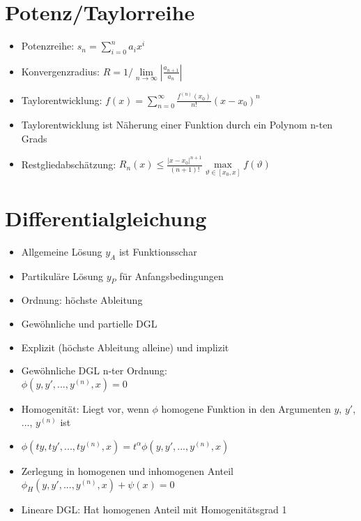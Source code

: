 \documentclass[a4paper,10pt]{article}
\begin{document}
\begin{multicols}{2}
\section {Potenz/Taylorreihe}
\begin{itemize}
\item Potenzreihe: $s_n = \sum_{i=0}^n a_i x^i$
\item Konvergenzradius: $R = 1/\lim\limits_{n \to \infty} |\frac{a_{n+1}}{a_n}|$
\item Taylorentwicklung: $f(x)=\sum_{n=0}^{\infty} \frac{f^{(n)}(x_0)}{n!} (x-x_0)^n$
\item Taylorentwicklung ist Näherung einer Funktion durch ein Polynom n-ten Grads
\item Restgliedabschätzung: $R_n(x) \le \frac{|x-x_0|^{n+1}}{(n+1)!} \max\limits_{\vartheta \in [x_0,x]} f(\vartheta)$
\end{itemize}

\section {Differentialgleichung}
\begin{itemize}
\item Allgemeine Lösung $y_A$ ist Funktionsschar
\item Partikuläre Lösung $y_P$ für Anfangsbedingungen
\item Ordnung: höchste Ableitung
\item Gewöhnliche und partielle DGL
\item Explizit (höchste Ableitung alleine) und implizit
\item Gewöhnliche DGL n-ter Ordnung:\\
$\phi(y,y',...,y^{(n)},x) = 0$
\item Homogenität: Liegt vor, wenn $\phi$ homogene Funktion in den Argumenten $y$, $y'$, $...$, $y^{(n)}$ ist
\item $\phi(ty,ty',...,ty^{(n)},x) = t^\alpha \phi(y,y',...,y^{(n)},x)$
\item Zerlegung in homogenen und inhomogenen Anteil $\phi_H(y,y',...,y^{(n)},x) + \psi(x) = 0$
\item Lineare DGL: Hat homogenen Anteil mit Homogenitätsgrad 1
\end{itemize}


\end{multicols}
\end{document}

